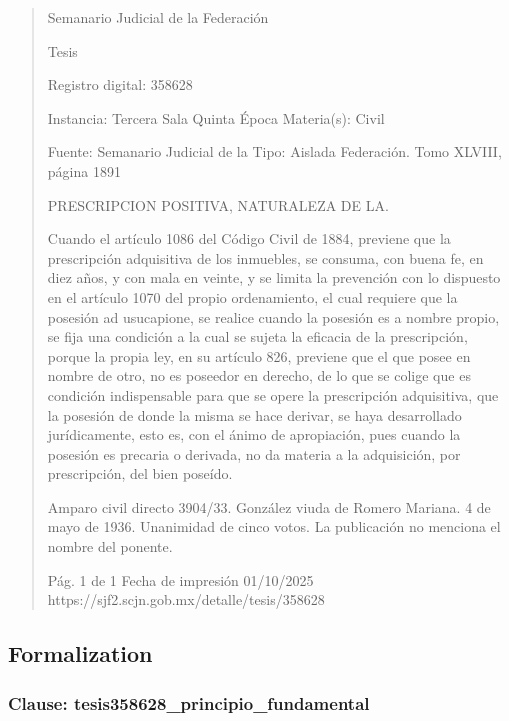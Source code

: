\documentclass[11pt,a4paper]{article}
\begin{document}
\begin{quote}
                                                   Semanario Judicial de la Federación

                                                  Tesis

 Registro digital: 358628

 Instancia: Tercera Sala          Quinta Época                          Materia(s): Civil

                                  Fuente: Semanario Judicial de la      Tipo: Aislada
                                  Federación.
                                  Tomo XLVIII, página 1891


PRESCRIPCION POSITIVA, NATURALEZA DE LA.


Cuando el artículo 1086 del Código Civil de 1884, previene que la prescripción adquisitiva de los
inmuebles, se consuma, con buena fe, en diez años, y con mala en veinte, y se limita la prevención
con lo dispuesto en el artículo 1070 del propio ordenamiento, el cual requiere que la posesión ad
usucapione, se realice cuando la posesión es a nombre propio, se fija una condición a la cual se
sujeta la eficacia de la prescripción, porque la propia ley, en su artículo 826, previene que el que
posee en nombre de otro, no es poseedor en derecho, de lo que se colige que es condición
indispensable para que se opere la prescripción adquisitiva, que la posesión de donde la misma se
hace derivar, se haya desarrollado jurídicamente, esto es, con el ánimo de apropiación, pues
cuando la posesión es precaria o derivada, no da materia a la adquisición, por prescripción, del bien
poseído.


Amparo civil directo 3904/33. González viuda de Romero Mariana. 4 de mayo de 1936. Unanimidad
de cinco votos. La publicación no menciona el nombre del ponente.




                                             Pág. 1 de 1             Fecha de impresión 01/10/2025
  https://sjf2.scjn.gob.mx/detalle/tesis/358628

\end{quote}

\subsection{Formalization}

\subsubsection{Clause: tesis358628\_principio\_fundamental}
\end{document}
